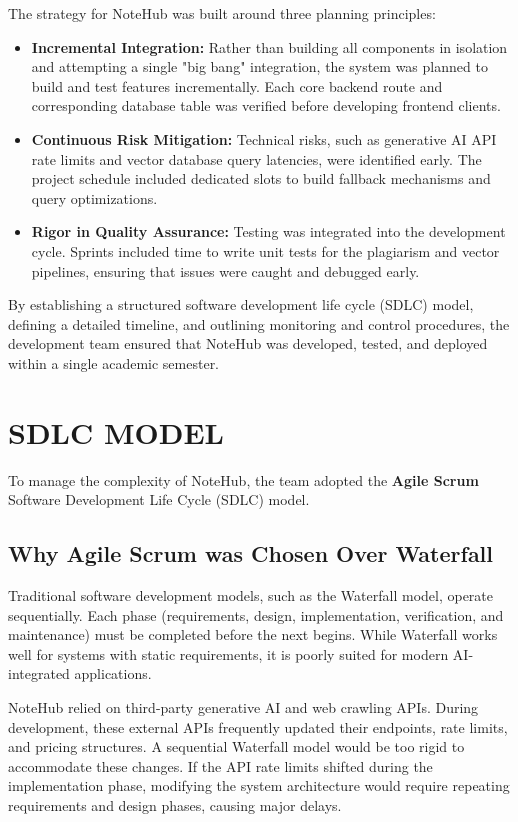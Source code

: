 \documentclass[12,Times new Roman,a4paper]{report}
\begin{document}
The strategy for NoteHub was built around three planning principles:
\begin{itemize}
    \item \textbf{Incremental Integration:} Rather than building all components in isolation and attempting a single "big bang" integration, the system was planned to build and test features incrementally. Each core backend route and corresponding database table was verified before developing frontend clients.
    \item \textbf{Continuous Risk Mitigation:} Technical risks, such as generative AI API rate limits and vector database query latencies, were identified early. The project schedule included dedicated slots to build fallback mechanisms and query optimizations.
    \item \textbf{Rigor in Quality Assurance:} Testing was integrated into the development cycle. Sprints included time to write unit tests for the plagiarism and vector pipelines, ensuring that issues were caught and debugged early.
\end{itemize}

By establishing a structured software development life cycle (SDLC) model, defining a detailed timeline, and outlining monitoring and control procedures, the development team ensured that NoteHub was developed, tested, and deployed within a single academic semester.

\section{SDLC MODEL}
To manage the complexity of NoteHub, the team adopted the \textbf{Agile Scrum} Software Development Life Cycle (SDLC) model. 

\subsection{Why Agile Scrum was Chosen Over Waterfall}
Traditional software development models, such as the Waterfall model, operate sequentially. Each phase (requirements, design, implementation, verification, and maintenance) must be completed before the next begins. While Waterfall works well for systems with static requirements, it is poorly suited for modern AI-integrated applications. 

NoteHub relied on third-party generative AI and web crawling APIs. During development, these external APIs frequently updated their endpoints, rate limits, and pricing structures. A sequential Waterfall model would be too rigid to accommodate these changes. If the API rate limits shifted during the implementation phase, modifying the system architecture would require repeating requirements and design phases, causing major delays.
\end{document}
